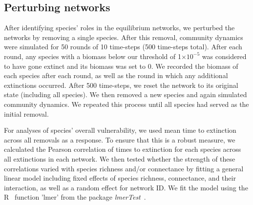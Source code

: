 \documentclass[12pt]{article}
\begin{document}


	\subsection*{Perturbing networks}

		After identifying species' roles in the equilibrium networks, we perturbed the networks by removing a single species. After this removal, community dynamics were simulated for 50 rounds of 10 time-steps (500 time-steps total). After each round, any species with a biomass below our threshold of 1$\times10^{-5}$ was considered to have gone extinct and its biomass was set to 0. We recorded the biomass of each species after each round, as well as the round in which any additional extinctions occurred. After 500 time-steps, we reset the network to its original state (including all species). We then removed a new species and again simulated community dynamics. We repeated this process until all species had served as the initial removal.


		For analyses of species' overall vulnerability, we used mean time to extinction across all removals as a response. To ensure that this is a robust measure, we calculated the Pearson correlation of times to extinction for each species across all extinctions in each network. We then tested whether the strength of these correlations varied with species richness and/or connectance by fitting a general linear model including fixed effects of species richness, connectance, and their interaction, as well as a random effect for network ID. We fit the model using the R~\citep{R} function 'lmer' from the package \emph{lmerTest}~\citep{lmerTest}.
\end{document}
